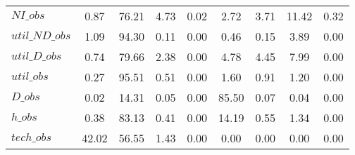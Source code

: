 \begin{center}
\begin{longtable}{lcccccccc}
$NI\_obs        $	 & 	         0.87	 & 	        76.21	 & 	         4.73	 & 	         0.02	 & 	         2.72	 & 	         3.71	 & 	        11.42	 & 	         0.32 \\ 
$util\_ND\_obs  $	 & 	         1.09	 & 	        94.30	 & 	         0.11	 & 	         0.00	 & 	         0.46	 & 	         0.15	 & 	         3.89	 & 	         0.00 \\ 
$util\_D\_obs   $	 & 	         0.74	 & 	        79.66	 & 	         2.38	 & 	         0.00	 & 	         4.78	 & 	         4.45	 & 	         7.99	 & 	         0.00 \\ 
$util\_obs      $	 & 	         0.27	 & 	        95.51	 & 	         0.51	 & 	         0.00	 & 	         1.60	 & 	         0.91	 & 	         1.20	 & 	         0.00 \\ 
$D\_obs         $	 & 	         0.02	 & 	        14.31	 & 	         0.05	 & 	         0.00	 & 	        85.50	 & 	         0.07	 & 	         0.04	 & 	         0.00 \\ 
$h\_obs         $	 & 	         0.38	 & 	        83.13	 & 	         0.41	 & 	         0.00	 & 	        14.19	 & 	         0.55	 & 	         1.34	 & 	         0.00 \\ 
$tech\_obs      $	 & 	        42.02	 & 	        56.55	 & 	         1.43	 & 	         0.00	 & 	         0.00	 & 	         0.00	 & 	         0.00	 & 	         0.00 \\ 
\end{longtable}
 \end{center}
